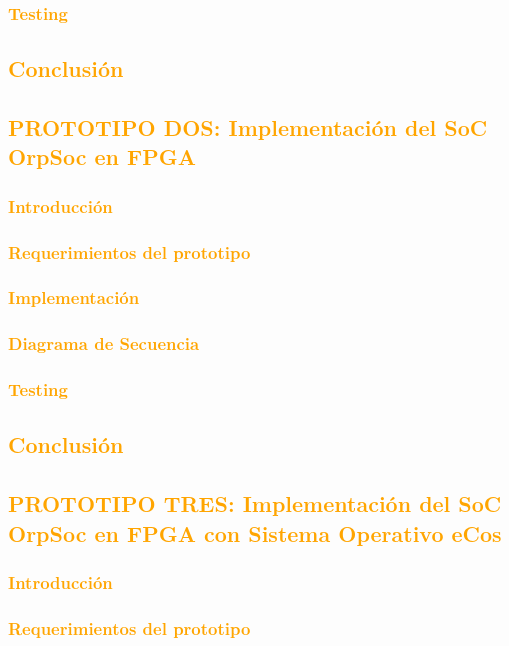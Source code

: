 \documentclass[a4paper,11pt]{article}
\begin{document}
			\subsubsection{\textcolor{orange}{Testing}}
		\subsection{\textcolor{orange}{Conclusión}}
	\subsection{\textcolor{orange}{PROTOTIPO DOS: Implementación del SoC OrpSoc en FPGA}}
		\subsubsection{\textcolor{orange}{Introducción}}
		\subsubsection{\textcolor{orange}{Requerimientos del prototipo}}
		\subsubsection{\textcolor{orange}{Implementación}}
			\subsubsection{\textcolor{orange}{Diagrama de Secuencia}}
			\subsubsection{\textcolor{orange}{Testing}}
		\subsection{\textcolor{orange}{Conclusión}}
	\subsection{\textcolor{orange}{PROTOTIPO TRES: Implementación del SoC OrpSoc en FPGA con Sistema Operativo eCos}}
		\subsubsection{\textcolor{orange}{Introducción}}
		\subsubsection{\textcolor{orange}{Requerimientos del prototipo}}
\end{document}
